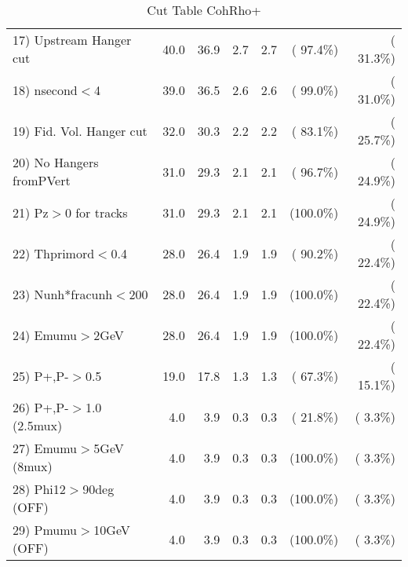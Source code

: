 \begin{table}[h!]
\begin{tabular}{||l||r|r|r|r|r|r||}
 17) Upstream Hanger cut  &         40.0 &         36.9 &          2.7 &          2.7 & ( 97.4\%) & ( 31.3\%) \\
 18) nsecond$<$4          &         39.0 &         36.5 &          2.6 &          2.6 & ( 99.0\%) & ( 31.0\%) \\
 19) Fid. Vol. Hanger cut &         32.0 &         30.3 &          2.2 &          2.2 & ( 83.1\%) & ( 25.7\%) \\
 20) No Hangers fromPVert &         31.0 &         29.3 &          2.1 &          2.1 & ( 96.7\%) & ( 24.9\%) \\
 21) Pz$>$0 for tracks    &         31.0 &         29.3 &          2.1 &          2.1 & (100.0\%) & ( 24.9\%) \\
 22) Thprimord$<$0.4      &         28.0 &         26.4 &          1.9 &          1.9 & ( 90.2\%) & ( 22.4\%) \\
 23) Nunh*fracunh$<$200   &         28.0 &         26.4 &          1.9 &          1.9 & (100.0\%) & ( 22.4\%) \\
 24) Emumu$>$2GeV         &         28.0 &         26.4 &          1.9 &          1.9 & (100.0\%) & ( 22.4\%) \\
 25) P+,P-$>$0.5          &         19.0 &         17.8 &          1.3 &          1.3 & ( 67.3\%) & ( 15.1\%) \\
 26) P+,P-$>$1.0 (2.5mux) &          4.0 &          3.9 &          0.3 &          0.3 & ( 21.8\%) & (  3.3\%) \\
 27) Emumu$>$5GeV  (8mux) &          4.0 &          3.9 &          0.3 &          0.3 & (100.0\%) & (  3.3\%) \\
 28) Phi12$>$90deg  (OFF) &          4.0 &          3.9 &          0.3 &          0.3 & (100.0\%) & (  3.3\%) \\
 29) Pmumu$>$10GeV  (OFF) &          4.0 &          3.9 &          0.3 &          0.3 & (100.0\%) & (  3.3\%) \\
 \hline
 \hline
 \end{tabular}
 \caption{Cut Table  CohRho+  }
 \label{tab-cutcohjpsi-mumu_anumunc}
 \end{table}
